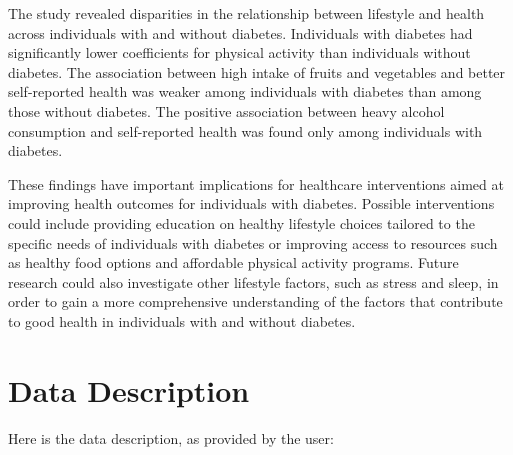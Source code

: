 \documentclass[12pt]{article}
\begin{document}
The study revealed disparities in the relationship between lifestyle and health across individuals with and without diabetes. Individuals with diabetes had significantly lower coefficients for physical activity than individuals without diabetes. The association between high intake of fruits and vegetables and better self-reported health was weaker among individuals with diabetes than among those without diabetes. The positive association between heavy alcohol consumption and self-reported health was found only among individuals with diabetes.

These findings have important implications for healthcare interventions aimed at improving health outcomes for individuals with diabetes. Possible interventions could include providing education on healthy lifestyle choices tailored to the specific needs of individuals with diabetes or improving access to resources such as healthy food options and affordable physical activity programs. Future research could also investigate other lifestyle factors, such as stress and sleep, in order to gain a more comprehensive understanding of the factors that contribute to good health in individuals with and without diabetes.





\clearpage
\appendix
\section{Data Description} \label{sec:data_description} Here is the data description, as provided by the user:
\end{document}
